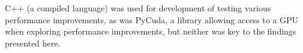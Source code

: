 \documentclass[letterpaper]{report}
\begin{document}
C++ (a compiled language) was used for development of testing various performance improvements, as was PyCuda, a library allowing access to a GPU when exploring performance improvements, but  neither was key to the findings presented here.

%
%
\end{document}
